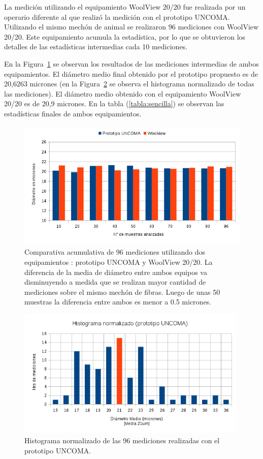 \documentclass[runningheads,a4paper]{llncs}
\begin{document}
La medición utilizando el equipamiento WoolView 20/20 fue realizada por un operario diferente al que realizó la medición con el prototipo UNCOMA. Utilizando el mismo mechón de animal se realizaron 96 mediciones con WoolView 20/20. Este equipamiento acumula la estadística, por lo que se obtuvieron los detalles de las estadísticas intermedias cada 10 mediciones. 

En la Figura~\ref{fig:prototipovswv} se observan los resultados de las mediciones intermedias de ambos equipamientos.
El diámetro medio final obtenido por el prototipo propuesto es de 20,6263 micrones (en la Figura~\ref{fig:histograma} se observa el histograma normalizado de todas las mediciones). El diámetro medio obtenido con el equipamiento WoolView 20/20 es de 20,9 micrones. En la tabla (\ref{tabla:sencilla}) se observan las estadísticas finales de ambos equipamientos.

\begin{figure}
\centering
\includegraphics[height=6.2cm]{prototipovswv}
\caption{Comparativa acumulativa de 96 mediciones utilizando dos equipamientos : prototipo UNCOMA y WoolView 20/20.
La diferencia de la media de diámetro entre ambos equipos va disminuyendo a medida que se realizan mayor cantidad de mediciones sobre el mismo mechón de fibras. Luego de unas 50 muestras la diferencia entre ambos es menor a 0.5 micrones.}
\label{fig:prototipovswv}
\end{figure}

\begin{figure}
\centering
\includegraphics[height=6.2cm]{histograma}
\caption{Histograma normalizado de las 96 mediciones realizadas con el prototipo UNCOMA.}
\label{fig:histograma}
\end{figure}
\end{document}
